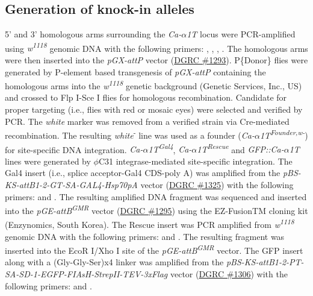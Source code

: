 \subsection*{Generation of knock-in alleles}

5' and 3' homologous arms surrounding the \emph{Ca-$\alpha$1T} locus were PCR-amplified using \emph{w\textsuperscript{1118}} genomic DNA with the following primers: , , , .
The homologous arms were then inserted into the \emph{pGX-attP} vector (\href{https://dgrc.bio.indiana.edu/product/View?product=1293}{DGRC \#1293}).
P\{Donor\} flies were generated by P-element based transgenesis of \emph{pGX-attP} containing the homologous arms into the \emph{w\textsuperscript{1118}} genetic background (Genetic Services, Inc., US) and crossed to Flp I-Sce I flies for homologous recombination.
Candidate for proper targeting (i.e., flies with red or mosaic eyes) were selected and verified by PCR.
The \emph{white} marker was removed from a verified strain via Cre-mediated recombination.
The resulting \emph{white}\textsuperscript{-} line was used as a founder (\emph{Ca-$\alpha$1T\textsuperscript{Founder,w-}}) for site-specific DNA integration.
\emph{Ca-$\alpha$1T\textsuperscript{Gal4}}, \emph{Ca-$\alpha$1T\textsuperscript{Rescue}} and \emph{GFP::Ca-$\alpha$1T} lines were generated by $\phi$C31 integrase-mediated site-specific integration. 
The Gal4 insert (i.e., splice acceptor-Gal4 CDS-poly A) was amplified from the \emph{pBS-KS-attB1-2-GT-SA-GAL4-Hsp70pA} vector (\href{https://dgrc.bio.indiana.edu/product/View?product=1325}{DGRC \#1325}) with the following primers:  and . 
The resulting amplified DNA fragment was sequenced and inserted into the \emph{pGE-attB\textsuperscript{GMR}} vector (\href{https://dgrc.bio.indiana.edu/product/View?product=1295}{DGRC \#1295}) using the EZ-FusionTM cloning kit (Enzynomics, South Korea). 
The Rescue insert was PCR amplified from \emph{w\textsuperscript{1118}} genomic DNA with the following primers:  and .
The resulting fragment was inserted into the EcoR I/Xho I site of the \emph{pGE-attB\textsuperscript{GMR}} vector. 
The GFP insert along with a (Gly-Gly-Ser)x4 linker was amplified from the \emph{pBS-KS-attB1-2-PT-SA-SD-1-EGFP-FIAsH-StrepII-TEV-3xFlag} vector (\href{https://dgrc.bio.indiana.edu/product/View?product=1306}{DGRC \#1306}) with the following primers:  and .
